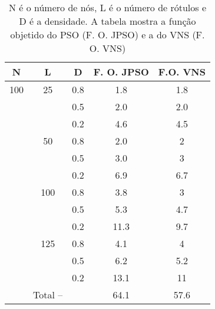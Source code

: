 \documentclass{sig-alternate-05-2015}
\begin{document}
\begin{table}

\begin{tabular}{ccccc}
        \hline \rule[-2ex]{0pt}{5.5ex} N & L & D & F. O. JPSO &  F.O. VNS\\
         \hline\rule[-2ex]{0pt}{5.5ex} 100 & 25 & 0.8 & 1.8 & 1.8 \\
         \rule[-2ex]{0pt}{5.5ex}  &  & 0.5 & 2.0 & 2.0\\
         \rule[-2ex]{0pt}{5.5ex}  &  & 0.2 & 4.6 & 4.5\\
         \rule[-2ex]{0pt}{5.5ex}  & 50 & 0.8 & 2.0 & 2\\
         \rule[-2ex]{0pt}{5.5ex}  &  & 0.5 & 3.0 & 3\\
         \rule[-2ex]{0pt}{5.5ex}  &  & 0.2 & 6.9  & 6.7\\
         \rule[-2ex]{0pt}{5.5ex}  & 100 & 0.8 & 3.8 & 3\\
         \rule[-2ex]{0pt}{5.5ex}  &  & 0.5 & 5.3 & 4.7\\
         \rule[-2ex]{0pt}{5.5ex}  &  & 0.2 & 11.3 & 9.7\\ 
         \rule[-2ex]{0pt}{5.5ex}  & 125 & 0.8 & 4.1 & 4\\ 
         \rule[-2ex]{0pt}{5.5ex}  &  & 0.5 & 6.2 & 5.2\\ 
         \rule[-2ex]{0pt}{5.5ex}  &  & 0.2 & 13.1& 11\\ 
         \hline\rule[-2ex]{0pt}{5.5ex}  & Total -- &  & 64.1 & 57.6\\ 
        \hline 
\end{tabular} 
\caption{N é o número de nós, L é o número de rótulos e D é a densidade.  A tabela mostra a função objetido do PSO (F. O. JPSO) e a do VNS (F. O. VNS)}
\label{tab3}
\end{table}
\end{document}
